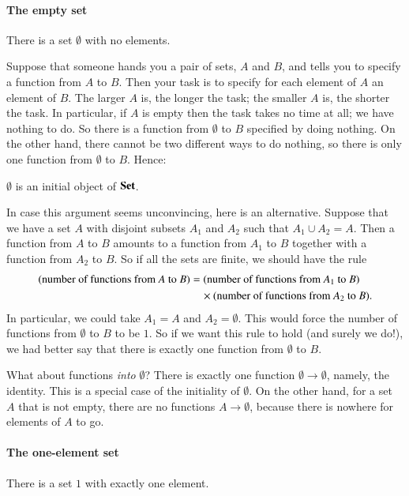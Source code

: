\paragraph*{The empty set}  
%
%
There is a set $\emptyset$ with no elements.

Suppose that someone hands you a pair of sets, $A$ and $B$, and tells you
to specify a function from $A$ to $B$.  Then your task is to specify for
each element of $A$ an element of $B$.  The larger $A$ is, the longer the
task; the smaller $A$ is, the shorter the task.  In particular, if $A$ is
empty then the task takes no time at all; we have nothing to do.  So there
is a function from $\emptyset$ to $B$ specified by doing nothing.  On the
other hand, there cannot be two different ways to do nothing, so there is
only one function from $\emptyset$ to $B$.  Hence:
% 
\begin{setprop}
$\emptyset$ is an initial object of \hspace{.1em}$\mathbf{Set}$.
\end{setprop}

In case this argument seems unconvincing, here is an alternative.  Suppose
that we have a set $A$ with disjoint subsets $A_1$ and $A_2$ such that $A_1
\cup A_2 = A$.  Then a function from $A$ to $B$ amounts to a function from
$A_1$ to $B$ together with a function from $A_2$ to $B$.  So if all the
sets are finite, we should have the rule
% 
\begin{align*}  
\label{p:num-fns}
%
\index{function!number of functions}
%
(\text{number of functions from $A$ to $B$})	&
=	
(\text{number of functions from $A_1$ to $B$})	\\
& \quad\times
(\text{number of functions from $A_2$ to $B$}).
\end{align*}
% 
In particular, we could take $A_1 = A$ and $A_2 = \emptyset$.  This would
force the number of functions from $\emptyset$ to $B$ to be $1$.  So if we
want this rule to hold (and surely we do!), we had better say that there is
exactly one function from $\emptyset$ to $B$.

What about functions \emph{into} $\emptyset$?  There is exactly one function
$\emptyset \to \emptyset$, namely, the identity.  This is a special case of
the initiality of $\emptyset$.  On the other hand, for a set $A$ that is not
empty, there are no functions $A \to \emptyset$, because there is nowhere for
elements of $A$ to go.


\paragraph*{The one-element set}  
%
%
There is a set $1$ with exactly one element.

